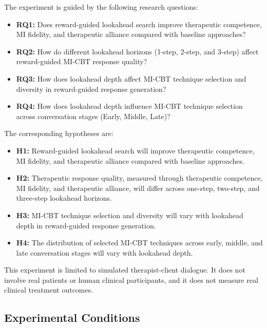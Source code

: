 The experiment is guided by the following research questions:

\begin{itemize}
    \item \textbf{RQ1:} Does reward-guided lookahead search improve therapeutic competence, MI fidelity, and therapeutic alliance compared with baseline approaches?

    \item \textbf{RQ2:} How do different lookahead horizons (1-step, 2-step, and 3-step) affect reward-guided MI-CBT response quality?

    \item \textbf{RQ3:} How does lookahead depth affect MI-CBT technique selection and diversity in reward-guided response generation?

    \item \textbf{RQ4:} How does lookahead depth influence MI-CBT technique selection across conversation stages (Early, Middle, Late)?
\end{itemize}

The corresponding hypotheses are:

\begin{itemize}
    \item \textbf{H1:} Reward-guided lookahead search will improve therapeutic competence, MI fidelity, and therapeutic alliance compared with baseline approaches.

    \item \textbf{H2:} Therapeutic response quality, measured through therapeutic competence, MI fidelity, and therapeutic alliance, will differ across one-step, two-step, and three-step lookahead horizons.

    \item \textbf{H3:} MI-CBT technique selection and diversity will vary with lookahead depth in reward-guided response generation.

    \item \textbf{H4:} The distribution of selected MI-CBT techniques across early, middle, and late conversation stages will vary with lookahead depth.
\end{itemize}

This experiment is limited to simulated therapist-client dialogue. It does not involve real patients or human clinical participants, and it does not measure real clinical treatment outcomes.

\subsection{Experimental Conditions}

